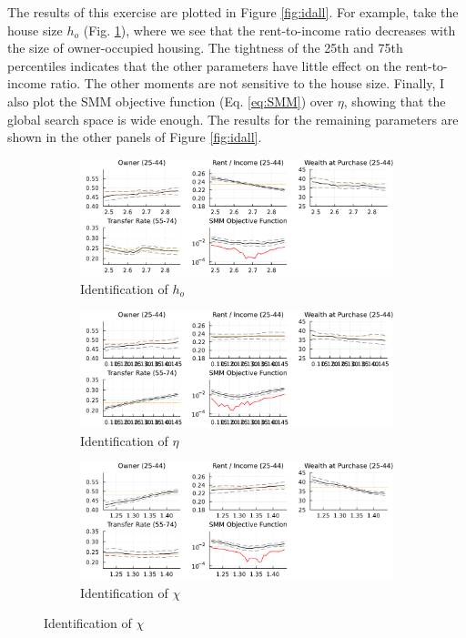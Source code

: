 \documentclass[12pt]{article}
\begin{document}
The results of this exercise are plotted in Figure \ref{fig:idall}. For example, take the house size $h_o$ (Fig. \ref{fig:hoid}), where we see that the rent-to-income ratio decreases with the size of owner-occupied housing. The tightness of the 25th and 75th percentiles indicates that the other parameters have little effect on the rent-to-income ratio. The other moments are not sensitive to the house size. Finally, I also plot the SMM objective function (Eq. \ref{eq:SMM}) over $\eta$, showing that the global search space is wide enough. The results for the remaining parameters are shown in the other panels of Figure \ref{fig:idall}.

\begin{figure}\caption{Identification of $\eta,h_0,\chi$.}\label{fig:idall}
	\begin{subfigure}{\textwidth}\caption{Identification of $h_o$}\label{fig:hoid}
		\includegraphics[width=\textwidth]{../tabfig/est/identification/ho.pdf}
	\end{subfigure}
	\begin{subfigure}{\textwidth}\caption{Identification of $\eta$}\label{fig:etaid}
		\includegraphics[width=\textwidth]{../tabfig/est/identification/eta.pdf}
	\end{subfigure}
	\begin{subfigure}{\textwidth}\caption{Identification of $\chi$}\label{fig:chiid}
		\includegraphics[width=\textwidth]{../tabfig/est/identification/chi.pdf}

\end{subfigure}
\end{figure}
\end{document}
